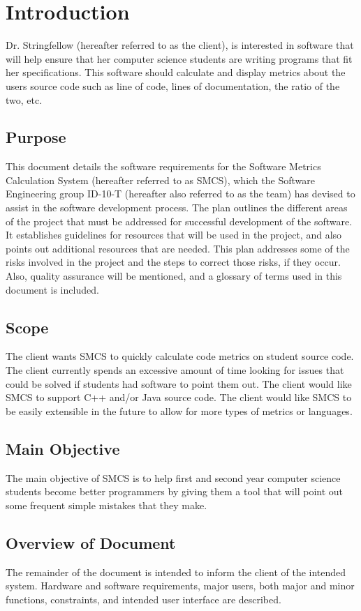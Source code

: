 \documentclass{scrreprt}
\begin{document}
	\chapter{Introduction}
	Dr. Stringfellow (hereafter referred to as the client), is interested in software that will help ensure that her computer science students are writing programs that fit her specifications. This software should calculate and display metrics about the users source code such as line of code, lines of documentation, the ratio of the two, etc.
	\section{Purpose}
	This document details the software requirements for the Software Metrics Calculation System (hereafter referred to as SMCS), which the Software Engineering group ID-10-T (hereafter also referred to as the team) has devised to assist in the software development process. The plan outlines the different areas of the project that must be addressed for successful development of the software. It establishes guidelines for resources that will be used in the project, and also points out additional resources that are needed. This plan addresses some of the risks involved in the project and the steps to correct those risks, if they occur. Also, quality assurance will be mentioned, and a glossary of terms used in this document is included.
	\section{Scope}
	The client wants SMCS to quickly calculate code metrics on student source code. The client currently spends an excessive amount of time looking for issues that could be solved if students had software to point them out. The client would like SMCS to support C++ and/or Java source code. The client would like SMCS to be easily extensible in the future to allow for more types of metrics or languages.
	\section{Main Objective}
	The main objective of SMCS is to help first and second year computer science students become better programmers by giving them a tool that will point out some frequent simple mistakes that they make.
	\section{Overview of Document}
	The remainder of the document is intended to inform the client of the intended system. Hardware and software requirements, major users, both major and minor functions, constraints, and intended user interface are described.
\end{document}

